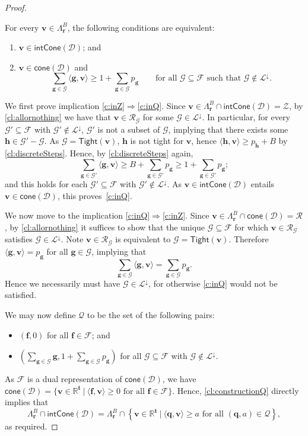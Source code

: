 \documentclass{article}
\renewcommand{\geq}{\geqslant}
\newcommand{\Dd}{\mathcal{D}}
\newcommand{\R}{\mathbb{R}}
\newcommand{\tup}[1]{{\mathbf{#1}}}
\newcommand{\tv}{\tup t}
\newcommand{\ff}{\tup f}
\renewcommand{\gg}{\tup g}
\newcommand{\hh}{\tup h}
\newcommand{\rr}{\tup r}
\newcommand{\qq}{\tup q}
\newcommand{\myvv}{\tup v} %
\newcommand{\Qq}{\mathcal{Q}}
\newcommand{\Ff}{\mathcal{F}}
\newcommand{\Gg}{\mathcal{G}}
\newcommand{\Rr}{\mathcal{R}}
\newcommand{\Zz}{\mathcal{Z}}
\newcommand{\Ss}{\mathscr{L}}
\newcommand{\Tight}{\mathsf{Tight}}
\newcommand{\sca}[2]{\langle #1,#2\rangle}
\renewcommand{\setminus}{-}
\newcommand{\realcone}{\mathsf{cone}}
\newcommand{\intcone}{\mathsf{intCone}}
\begin{document}
\begin{proof}
\begin{techclaim}\label{cl:constructionQ}
 For every $\myvv\in \Lambda_\rr^B$, the following conditions are equivalent:
 \begin{enumerate}[label=(\arabic*),ref=(\arabic*),nosep]
  \item\label{c:inZ} $\myvv\in \intcone(\Dd)$; and
  \item\label{c:inQ} $\myvv\in \realcone(\Dd)$ and
  $$\sum_{\gg\in \Gg} \sca{\gg}{\myvv} \geq 1+\sum_{\gg\in \Gg} p_\gg\qquad\textrm{for all }\Gg\subseteq \Ff\textrm{ such that }\Gg\notin \Ss^\downarrow.$$
 \end{enumerate}
\end{techclaim}
\begin{subproof}
We first prove implication \ref{c:inZ}$\Rightarrow$\ref{c:inQ}. Since $\myvv\in \Lambda_\rr^B\cap \intcone(\Dd)=\Zz$, by \cref{cl:allornothing} we have that $\myvv\in \Rr_\Gg$ for some $\Gg\in \Ss^\downarrow$. In particular, for every $\Gg'\subseteq \Ff$ with $\Gg'\notin \Ss^\downarrow$, $\Gg'$ is not a subset of $\Gg$, implying that there exists some $\hh\in \Gg'\setminus \Gg$. As $\Gg=\Tight(\myvv)$, $\hh$ is not tight for $\myvv$, hence $\sca{\hh}{\myvv}\geq p_\hh+B$ by \cref{cl:discreteSteps}. Hence, by  \cref{cl:discreteSteps} again,
$$\sum_{\gg\in \Gg'} \sca{\gg}{\myvv}\geq B+\sum_{\gg\in \Gg'} p_\gg\geq 1+\sum_{\gg\in \Gg'} p_\gg;$$
and this holds for each $\Gg'\subseteq \Ff$ with $\Gg'\notin \Ss^{\downarrow}$.
As $\myvv\in \intcone(\Dd)$ entails $\myvv\in \realcone(\Dd)$, this proves~\ref{c:inQ}.

We now move to the implication \ref{c:inQ}$\Rightarrow$\ref{c:inZ}. Since $\myvv\in  \Lambda_\rr^B\cap \realcone(\Dd)=\Rr$, by \cref{cl:allornothing} it suffices to show that the unique $\Gg\subseteq \Ff$ for which $\myvv\in \Rr_\Gg$ satisfies $\Gg\in \Ss^\downarrow$. Note $\myvv\in \Rr_\Gg$ is equivalent to $\Gg=\Tight(\myvv)$. Therefore $\sca{\gg}{\myvv}=p_\gg$ for all $\gg\in \Gg$, implying that
$$\sum_{\gg\in \Gg} \sca{\gg}{\myvv} = \sum_{\gg\in \Gg} p_\gg.$$
Hence we necessarily must have $\Gg\in \Ss^\downarrow$, for otherwise \ref{c:inQ} would not be satisfied.
\end{subproof}

We may now define $\Qq$ to be the set of the following pairs:
\begin{itemize}[nosep]
 \item $(\ff,0)$ for all $\ff\in \Ff$; and
 \item $\left(\sum_{\gg\in \Gg} \gg,1+\sum_{\gg\in \Gg} p_\gg\right)$ for all $\Gg\subseteq \Ff$ with $\Gg\notin \Ss^\downarrow.$
\end{itemize}
As $\Ff$ is a dual representation of $\realcone(\Dd)$, we have $\realcone(\Dd)=\{\myvv\in \R^\tv~|~\sca{\ff}{\myvv}\geq 0\textrm{ for all }\ff\in \Ff\}$. Hence, \cref{cl:constructionQ} directly implies that
$$\Lambda_\rr^B\cap \intcone(\Dd)=\Lambda_\rr^B\cap \left\{\myvv\in \R^\tv~|~\sca{\qq}{\myvv}\geq a\textrm{ for all }(\qq,a)\in \Qq\right\},$$
as required.


\end{proof}
\end{document}
